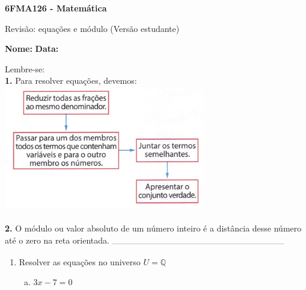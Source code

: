\documentclass[a4paper,14pt]{article}
\begin{document}
	
	\noindent\textbf{6FMA126 - Matemática} 
	
	\begin{center}Revisão: equações e módulo (Versão estudante)
	\end{center}
	
	\noindent\textbf{Nome:} \underline{\hspace{10cm}}
	\noindent\textbf{Data:} \underline{\hspace{4cm}}
	
	
	\begin{multicols}{2}
	    \noindent Lembre-se: \\ \textbf{1.} Para resolver equações, devemos: \\
	    \includegraphics[width=1\linewidth]{6FMA126_imagens/imagem1} \\\\
	    \textbf{2.} O módulo ou valor absoluto de um número inteiro é a distância desse número até o zero na reta orientada.
		\noindent\textsubscript{--------------------------------------------------------------------------}
		\begin{enumerate} 
			\item Resolver as equações no universo $U = \mathbb{Q}$
			\begin{enumerate}[a)]
				\item $3x - 7 = 0$ \\\\\\\\\\\\\\\\\\\\

\end{enumerate}
\end{enumerate}
\end{multicols}
\end{document}
